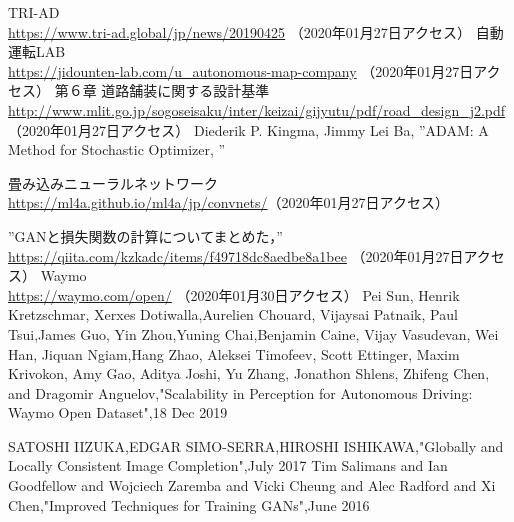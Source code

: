 \documentclass[a4j, 11pt]{jreport}
\begin{document}
\newpage
\begin{thebibliography}{1}
	TRI-AD\\ \url{https://www.tri-ad.global/jp/news/20190425} （2020年01月27日アクセス） 
	自動運転LAB\\ \url{https://jidounten-lab.com/u_autonomous-map-company} （2020年01月27日アクセス）
	第６章 道路舗装に関する設計基準\\ \url{http://www.mlit.go.jp/sogoseisaku/inter/keizai/gijyutu/pdf/road_design_j2.pdf} （2020年01月27日アクセス）
	Diederik P. Kingma, Jimmy Lei Ba, ”ADAM: A Method for Stochastic Optimizer, ”

	畳み込みニューラルネットワーク\\ \url{https://ml4a.github.io/ml4a/jp/convnets/}（2020年01月27日アクセス）

	”GANと損失関数の計算についてまとめた，” \\
	\url{https://qiita.com/kzkadc/items/f49718dc8aedbe8a1bee} （2020年01月27日アクセス）
	Waymo\\ \url{https://waymo.com/open/} （2020年01月30日アクセス）
	Pei Sun, Henrik Kretzschmar, Xerxes Dotiwalla,Aurelien Chouard, Vijaysai Patnaik, Paul Tsui,James Guo, Yin Zhou,Yuning Chai,Benjamin Caine, Vijay Vasudevan, Wei Han, Jiquan Ngiam,Hang Zhao, Aleksei Timofeev, Scott Ettinger, Maxim Krivokon, Amy Gao, Aditya Joshi, Yu	Zhang, Jonathon Shlens, Zhifeng Chen, and Dragomir Anguelov,"Scalability in Perception for Autonomous Driving: Waymo Open Dataset",18 Dec 2019
	
	SATOSHI IIZUKA,EDGAR SIMO-SERRA,HIROSHI ISHIKAWA,"Globally and Locally Consistent Image Completion",July 2017
	Tim Salimans and Ian Goodfellow and Wojciech Zaremba and Vicki Cheung and Alec Radford and Xi Chen,"Improved Techniques for Training GANs",June 2016
\end{thebibliography}
\newpage



\end{document}
